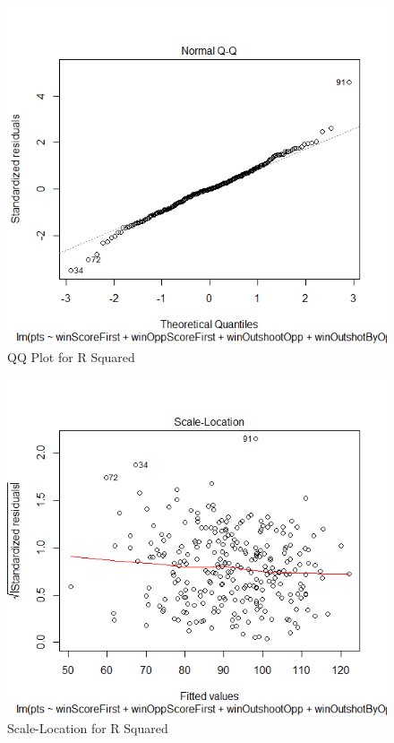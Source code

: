 \documentclass{beamer}
\begin{document}
\begin{frame}
	\begin{figure}
		\centering
		\includegraphics[width=0.7\linewidth]{R2}
		\caption{QQ Plot for R Squared}
		\label{fig:QQ Plot for R Squared}
	\end{figure}
\end{frame}
\begin{frame}
	\begin{figure}
		\centering
		\includegraphics[width=0.7\linewidth]{R3}
		\caption{Scale-Location for R Squared}
		\label{fig:Scale-Location for R Squared}
	\end{figure}
\end{frame}
\end{document}
